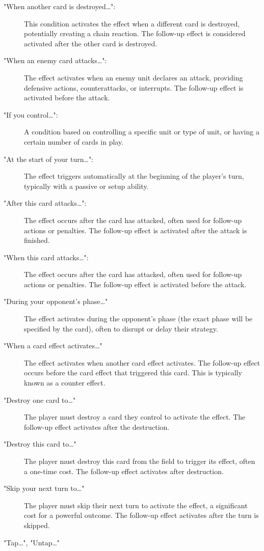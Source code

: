 \begin{description}
	\item["When another card is destroyed\dots":] This condition activates the effect when a different card is destroyed, potentially creating a chain reaction. The follow-up effect is considered activated after the other card is destroyed.
	\item["When an enemy card attacks\dots":] The effect activates when an enemy unit declares an attack, providing defensive actions, counterattacks, or interrupts. The follow-up effect is activated before the attack.
	\item["If you control\dots":] A condition based on controlling a specific unit or type of unit, or having a certain number of cards in play.
	\item["At the start of your turn\dots":] The effect triggers automatically at the beginning of the player's turn, typically with a passive or setup ability.
	\item["After this card attacks\dots":] The effect occurs after the card has attacked, often used for follow-up actions or penalties. The follow-up effect is activated after the attack is finished.
	\item["When this card attacks\dots":] The effect occurs after the card has attacked, often used for follow-up actions or penalties. The follow-up effect is activated before the attack.
	\item["During your opponent's phase\dots"]  The effect activates during the opponent's phase (the exact phase will be specified by the card), often to disrupt or delay their strategy.
	\item["When a card effect activates\dots"] The effect activates when another card effect activates. The follow-up effect occurs before the card effect that triggered this card. This is typically known as a counter effect.
	\item["Destroy one card to\dots"] The player must destroy a card they control to activate the effect. The follow-up effect activates after the destruction.
	\item["Destroy this card to\dots"] The player must destroy this card from the field to trigger its effect, often a one-time cost. The follow-up effect activates after destruction.
	\item["Skip your next turn to\dots"] The player must skip their next turn to activate the effect, a significant cost for a powerful outcome. The follow-up effect activates after the turn is skipped.
	\item["Tap\dots", "Untap\dots" ]
\end{description}

